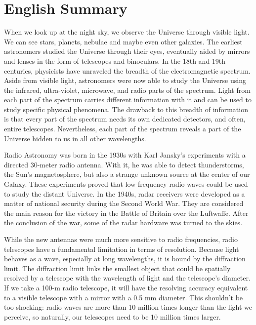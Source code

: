 \cleardoublepage
{}
 

\chapter*{English Summary}\label{ch:summary_eng}
When we look up at the night sky, we observe the Universe through visible light. We can see stars, planets, nebulae and maybe even other galaxies. The earliest astronomers studied the Universe through their eyes, eventually aided by mirrors and lenses in the form of telescopes and binoculars. In the 18th and 19th centuries, physicists have unraveled the breadth of the electromagnetic spectrum. Aside from visible light, astronomers were now able to study the Universe using the infrared, ultra-violet, microwave, and radio parts of the spectrum. Light from each part of the spectrum carries different information with it and can be used to study specific physical phenomena. The drawback to this breadth of information is that every part of the spectrum needs its own dedicated detectors, and often, entire telescopes. Nevertheless, each part of the spectrum reveals a part of the Universe hidden to us in all other wavelengths.

Radio Astronomy was born in the 1930s with Karl Jansky's experiments with a directed 30-meter radio antenna. With it, he was able to detect thunderstorms, the Sun's magnetosphere, but also a strange unknown source at the center of our Galaxy. These experiments proved that low-frequency radio waves could be used to study the distant Universe. In the 1940s, radar receivers were developed as a matter of national security during the Second World War. They are considered the main reason for the victory in the Battle of Britain over the Luftwaffe. After the conclusion of the war, some of the radar hardware was turned to the skies. 

While the new antennas were much more sensitive to radio frequencies, radio telescopes have a fundamental limitation in terms of resolution. Because light behaves as a wave, especially at long wavelengths, it is bound by the diffraction limit. The diffraction limit links the smallest object that could be spatially resolved by a telescope with the wavelength of light and the telescope's diameter. If we take a 100-m radio telescope, it will have the resolving accuracy equivalent to a visible telescope with a mirror with a 0.5 mm diameter. This shouldn't be too shocking: radio waves are more than 10 million times longer than the light we perceive, so naturally, our telescopes need to be 10 million times larger.                                                                      

